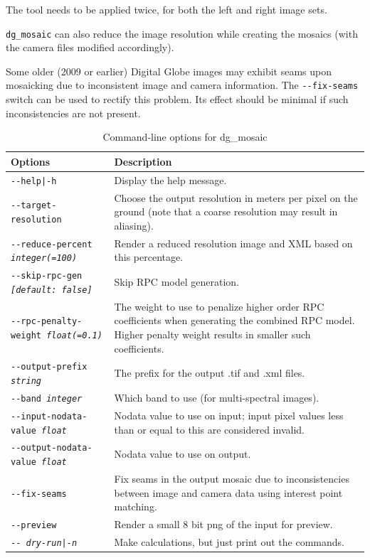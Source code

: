 The tool needs to be applied twice, for both the left and right image sets.

\texttt{dg\_mosaic} can also reduce the image resolution while creating the
mosaics (with the camera files modified accordingly).

Some older (2009 or earlier) Digital Globe images may exhibit seams upon mosaicking
due to inconsistent image and camera information. The \texttt{-\/-fix-seams} switch
can be used to rectify this problem. Its effect should be minimal if such inconsistencies
are not present.

\begin{longtable}{|l|p{10cm}|}
\caption{Command-line options for dg\_mosaic}
\label{tbl:dgmosaic}
\endfirsthead
\endhead
\endfoot
\endlastfoot
\hline
Options & Description \\ \hline \hline
\texttt{-\/-help|-h} & Display the help message.\\ \hline
\texttt{-\/-target-resolution} &
Choose the output resolution in meters per pixel on the ground (note that a coarse resolution may result in aliasing). \\ \hline
\texttt{-\/-reduce-percent \textit{integer(=100)}} &
Render a reduced resolution image and XML based on this percentage. \\ \hline
\texttt{-\/-skip-rpc-gen \textit{[default: false]}} &
Skip RPC model generation.\\ \hline
\texttt{-\/-rpc-penalty-weight \textit{float(=0.1)}} &
The weight to use to penalize higher order RPC coefficients when generating the combined RPC model. Higher penalty weight results in smaller such coefficients.\\ \hline
\texttt{-\/-output-prefix \textit{string}} & The prefix for the output .tif and .xml files. \\ \hline
\texttt{-\/-band \textit{integer}} & Which band to use (for multi-spectral images). \\ \hline
\texttt{-\/-input-nodata-value \textit{float}} & Nodata value to use on input; input pixel values less than or equal to this are considered invalid. \\ \hline
\texttt{-\/-output-nodata-value \textit{float}} & Nodata value to use on output. \\ \hline

\texttt{-\/-fix-seams} & Fix seams in the output mosaic due to inconsistencies between image and camera data using interest point matching. \\ \hline

\texttt{-\/-preview } & Render a small 8 bit png of the input for preview. \\ \hline
\texttt{-\/- \textit{dry-run|-n}} & Make calculations, but just print out the commands. \\ \hline
\end{longtable}

